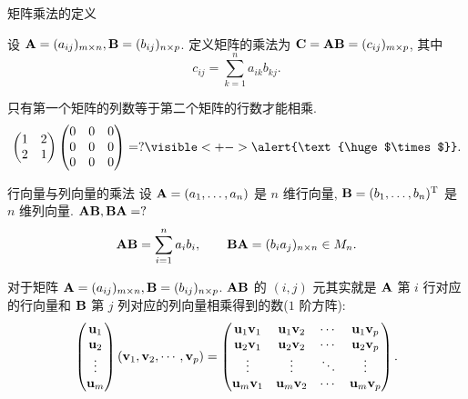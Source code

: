\begin{frame}{矩阵乘法的定义}
	\onslide<+->
	\begin{definition}
		设 ${\mathbf{A}}=(a_{ij})_{m\times n}, {\mathbf{B}}=(b_{ij})_{n\times p}$.
		定义矩阵的乘法为  ${\mathbf{C}}={\mathbf{A}}{\mathbf{B}}=(c_{ij})_{m\times p}$, 其中
		\[c_{ij}=\sum_{k=1}^n a_{ik}b_{kj}.\]
	\end{definition}
	\onslide<+->
	只有第一个矩阵的列数等于第二个矩阵的行数才能相乘.
	\onslide<+->
	\[\begin{pmatrix}
		1&2\\2&1
	\end{pmatrix}\begin{pmatrix}
		0&0&0\\0&0&0\\0&0&0
	\end{pmatrix}=?\visible<+->{\alert{\text{\huge$\times$}}}.\]
\end{frame}


\begin{frame}{行向量与列向量的乘法}
	\onslide<+->
	设 ${\mathbf{A}}=(a_1,\dots,a_n)$ 是 $n$ 维行向量, ${\mathbf{B}}=(b_1,\dots,b_n)^{\mathrm{T}}$ 是 $n$ 维列向量.
	\onslide<+->
	${\mathbf{A}}{\mathbf{B}},{\mathbf{B}}{\mathbf{A}}=?$
	\onslide<+->
	\[{\mathbf{A}}{\mathbf{B}}=\sum_{i=1}^n a_i b_i,\qquad
	{\mathbf{B}}{\mathbf{A}}=(b_ia_j)_{n\times n}\in M_n.\]

	\onslide<+->
	对于矩阵 ${\mathbf{A}}=(a_{ij})_{m\times n}, {\mathbf{B}}=(b_{ij})_{n\times p}$.
	\onslide<+->
	${\mathbf{A}}{\mathbf{B}}$ 的 $(i,j)$ 元其实就是 ${\mathbf{A}}$ 第 $i$ 行对应的行向量和 ${\mathbf{B}}$ 第 $j$ 列对应的列向量相乘得到的数($1$ 阶方阵):
	\[\begin{pmatrix}
		{\mathbf{u}}_1\\
		{\mathbf{u}}_2\\
		\vdots\\
		{\mathbf{u}}_m
	\end{pmatrix}({\mathbf{v}}_1,{\mathbf{v}}_2,\cdots,{\mathbf{v}}_p)=\begin{pmatrix}
		{\mathbf{u}}_1{\mathbf{v}}_1&{\mathbf{u}}_1{\mathbf{v}}_2&\cdots&{\mathbf{u}}_1{\mathbf{v}}_p\\
		{\mathbf{u}}_2{\mathbf{v}}_1&{\mathbf{u}}_2{\mathbf{v}}_2&\cdots&{\mathbf{u}}_2{\mathbf{v}}_p\\
		\vdots&\vdots&\ddots&\vdots\\
		{\mathbf{u}}_m{\mathbf{v}}_1&{\mathbf{u}}_m{\mathbf{v}}_2&\cdots&{\mathbf{u}}_m{\mathbf{v}}_p
	\end{pmatrix}.\]
\end{frame}


